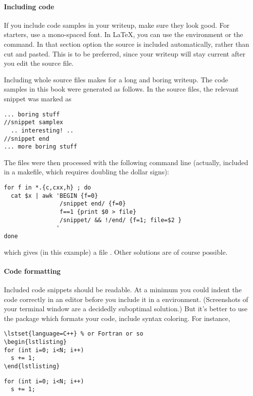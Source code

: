 \paragraph*{Including code}

If you include code samples in your writeup, make sure they look good. For starters,
use a mono-spaced font. In \LaTeX, you can use the  environment or the 
 command. In that section option the source is included automatically,
rather than cut and pasted. This is to be preferred, since your writeup will
stay current after you edit the source file.

Including whole source files makes for a long and boring writeup. The code samples in this
book were generated as follows. In the source files, the relevant snippet was marked as
\begin{verbatim}
... boring stuff
//snippet samplex
  .. interesting! ..
//snippet end
... more boring stuff
\end{verbatim}
The files were then processed with the following command line (actually, included
in a makefile, which requires doubling the dollar signs):
\begin{verbatim}
for f in *.{c,cxx,h} ; do
  cat $x | awk 'BEGIN {f=0}
                /snippet end/ {f=0}
                f==1 {print $0 > file}
                /snippet/ && !/end/ {f=1; file=$2 }
               '
done
\end{verbatim}
which gives (in this example) a file . Other solutions are of course possible.

\paragraph*{\bf Code formatting}

Included code snippets should be readable. At a minimum you could 
indent the code correctly in an editor before you include it in
a  environment. (Screenshots of your terminal
window are a decidedly suboptimal solution.)
But it's better to use the  package which formats
your code, include syntax coloring. For instance, 
\begin{verbatim}
\lstset{language=C++} % or Fortran or so
\begin{lstlisting}
for (int i=0; i<N; i++)
  s += 1;
\end{lstlisting}
\end{verbatim}
\lstset{language=C++} %
\begin{lstlisting}
for (int i=0; i<N; i++)
  s += 1;
\end{lstlisting}

